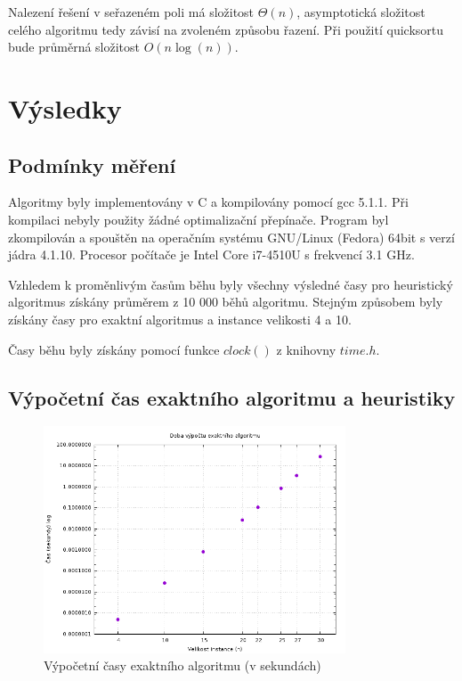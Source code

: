 \documentclass[11pt]{article}
\begin{document}
Nalezení řešení v seřazeném poli má složitost $\Theta(n)$, asymptotická složitost celého algoritmu tedy závisí na zvoleném způsobu řazení. Při použití quicksortu bude průměrná složitost $O(n \log(n))$.

\section{Výsledky}

\subsection{Podmínky měření}

Algoritmy byly implementovány v C a kompilovány pomocí gcc 5.1.1. Při kompilaci nebyly použity žádné optimalizační přepínače. Program byl zkompilován a spouštěn na operačním systému GNU/Linux (Fedora) 64bit s verzí jádra 4.1.10. Procesor počítače je Intel Core i7-4510U s frekvencí 3.1 GHz.

Vzhledem k proměnlivým časům běhu byly všechny výsledné časy pro heuristický algoritmus získány průměrem z 10 000 běhů algoritmu. Stejným způsobem byly získány časy pro exaktní algoritmus a instance velikosti 4 a 10.

Časy běhu byly získány pomocí funkce $clock()$ z knihovny $time.h$.

\subsection{Výpočetní čas exaktního algoritmu a heuristiky}

\begin{figure}[h!]
	\centering
	\includegraphics[width=0.8\textwidth]{time_bruteforce.png}
	\caption{Výpočetní časy exaktního algoritmu (v sekundách)}
	\label{fig:time_bruteforce}
\end{figure}
\end{document}

